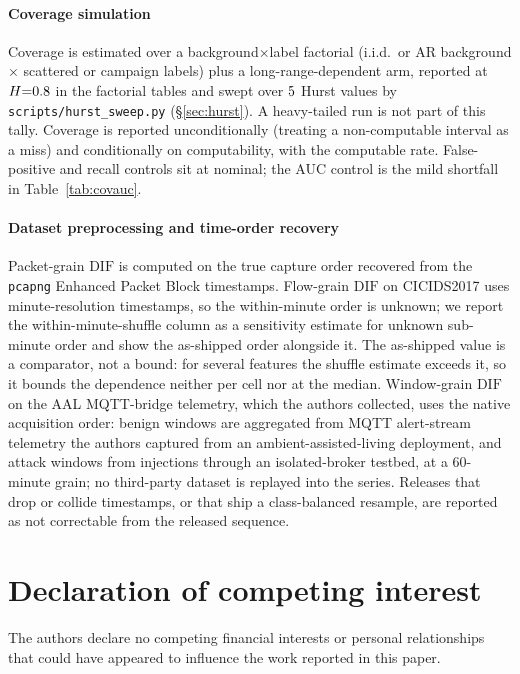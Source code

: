 \documentclass[a4paper,fleqn]{cas-dc}
\newcommand{\DIF}{\mathrm{DIF}}
\begin{document}
\paragraph{Coverage simulation} Coverage is estimated over a background$\times$label factorial
(i.i.d.\ or AR background $\times$ scattered or campaign labels) plus a long-range-dependent
arm, reported at $H{=}0.8$ in the factorial tables and swept over $5$ Hurst values by
\texttt{scripts/hurst\_sweep.py} (\S\ref{sec:hurst}). A heavy-tailed run is not part of this tally. Coverage is reported unconditionally (treating a
non-computable interval as a miss) and conditionally on computability, with the computable rate.
False-positive and recall controls sit at nominal; the AUC control is the mild shortfall in
Table~\ref{tab:covauc}.

\paragraph{Dataset preprocessing and time-order recovery} Packet-grain $\DIF$ is computed on the
true capture order recovered from the \texttt{pcapng} Enhanced Packet Block timestamps. Flow-grain
$\DIF$ on CICIDS2017 uses minute-resolution timestamps, so the within-minute order is unknown; we
report the within-minute-shuffle column as a sensitivity estimate for unknown sub-minute order
and show the as-shipped order alongside it.
The as-shipped value is a comparator, not a bound: for several features the shuffle estimate exceeds
it, so it bounds the dependence neither per cell nor at the median. Window-grain $\DIF$ on the AAL MQTT-bridge telemetry, which the authors collected, uses the
native acquisition order: benign windows are aggregated from MQTT alert-stream telemetry the authors
captured from an ambient-assisted-living deployment, and attack windows from injections through an
isolated-broker testbed, at a $60$-minute grain; no third-party dataset is replayed into the series.
Releases that drop or collide timestamps, or that ship a class-balanced resample, are reported
as not correctable from the released sequence.

\printcredits

\section*{Declaration of competing interest}
The authors declare no competing financial interests or personal relationships that could have
appeared to influence the work reported in this paper.
\end{document}
